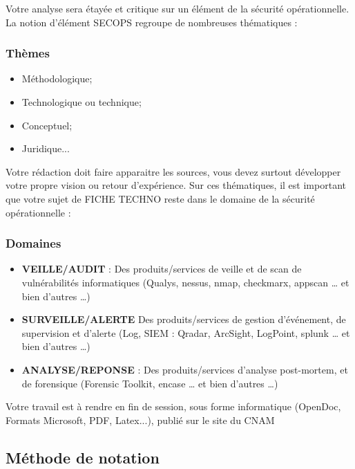 Votre  analyse sera étayée et critique sur un élément de la sécurité opérationnelle. La notion d'élément SECOPS regroupe de nombreuses thématiques :
\begin{frame}
\frametitle<presentation>{Thèmes}
\begin{itemize}
  \item Méthodologique;
  \item Technologique ou technique;
  \item Conceptuel;
  \item Juridique...
\end{itemize}

\end{frame}

Votre rédaction doit faire apparaitre les sources, vous devez surtout développer votre propre vision ou retour d'expérience.
Sur ces thématiques, il est important que votre sujet de FICHE TECHNO reste dans le domaine de la sécurité opérationnelle :

\begin{frame}
\frametitle<presentation>{Domaines}
\begin{itemize}
  \item \textbf{VEILLE/AUDIT} : Des produits/services de veille et de scan de vulnérabilités informatiques (Qualys, nessus, nmap, checkmarx, appscan … et bien d’autres …) 
  \item \textbf{SURVEILLE/ALERTE} Des produits/services de gestion d’événement, de supervision et d’alerte (Log, SIEM : Qradar, ArcSight, LogPoint, splunk … et bien d’autres …)
  \item \textbf{ANALYSE/REPONSE} : Des produits/services d’analyse post-mortem, et de forensique (Forensic Toolkit, encase … et bien d’autres …)
\end{itemize}

\end{frame}

Votre travail est à rendre en fin de session, sous forme informatique (OpenDoc, Formats Microsoft, PDF, Latex...), publié sur le site du CNAM 

\subsection{Méthode de notation}


